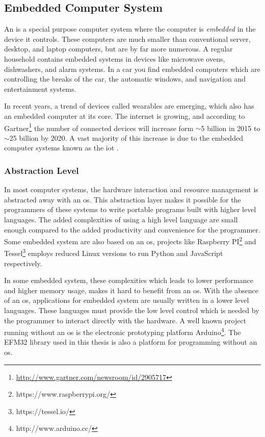 \subsection{Embedded Computer System}
An  is a special purpose computer system where the computer is \emph{embedded} in the device it controls.
These computers are much smaller than conventional server, desktop, and laptop computers, but are by far more numerous.
A regular household contains embedded systems in devices like microwave ovens, dishwashers, and alarm systems.
In a car you find embedded computers which are controlling the breaks of the car, the automatic windows, and navigation and entertainment systems.

In recent years, a trend of devices called wearables are emerging, which also has an embedded computer at its core.
The internet is growing, and according to Gartner\footnote{\url{http://www.gartner.com/newsroom/id/2905717}} the number of connected devices will increase form $\sim$5 billion in 2015 to $\sim$25 billion by 2020.
A vast majority of this increase is due to the embedded computer systems known as the \gls{iot} \cite{Valhouli2010}.

\subsubsection{Abstraction Level}
In most computer systems, the hardware interaction and resource management is abstracted away with an \gls{os}.
This abstraction layer makes it possible for the programmers of these systems to write portable programs built with higher level languages.
The added complexities of using a high level language are small enough compared to the added productivity and convenience for the programmer.
Some embedded system are also based on an \gls{os}, projects like Raspberry PI\footnote{https://www.raspberrypi.org/} and Tessel\footnote{https://tessel.io/} employs reduced Linux versions to run Python and JavaScript respectively.

In some embedded system, these complexities which leads to lower performance and higher memory usage, makes it hard to benefit from an \gls{os}.
With the absence of an \gls{os}, applications for embedded system are usually written in a lower level languages.
These languages must provide the low level control which is needed by the programmer to interact directly with the hardware.
A well known project running without an \gls{os} is the electronic prototyping platform Arduino\footnote{http://www.arduino.cc/}.
The EFM32 {\emlib} library used in this thesis is also a platform for {\C} programming without an \gls{os}.

